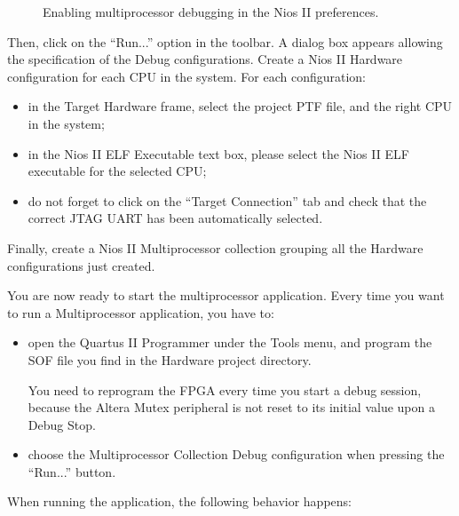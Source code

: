 %
\begin{figure}


\caption{\label{fig:tutorial-niospreferences}Enabling multiprocessor
debugging in the Nios II preferences.}
\end{figure}


Then, click on the {}``Run...'' option in the toolbar. A dialog box
appears allowing the specification of the Debug configurations.
Create a Nios II Hardware configuration for each CPU in the system.
For each configuration:

\begin{itemize}
\item in the Target Hardware frame, select the project PTF file, and
  the right CPU in the system;
\item in the Nios II ELF Executable text box, please select the Nios
  II ELF executable for the selected CPU;
\item do not forget to click on the ``Target Connection'' tab and
  check that the correct JTAG UART has been automatically selected.
\end{itemize}

Finally, create a Nios II Multiprocessor collection grouping all the
Hardware configurations just created.

You are now ready to start the multiprocessor application. Every time
you want to run a Multiprocessor application, you have to:

\begin{itemize}
\item open the Quartus II Programmer under the Tools menu, and program
  the SOF file you find in the Hardware project directory. 
  \begin{warning}
    You need to reprogram the FPGA every time you start a debug
    session, because the Altera Mutex peripheral is not reset to its
    initial value upon a Debug Stop.
  \end{warning}
\item choose the Multiprocessor Collection Debug configuration when
  pressing the ``Run...'' button.
\end{itemize}
When running the application, the following behavior happens:

